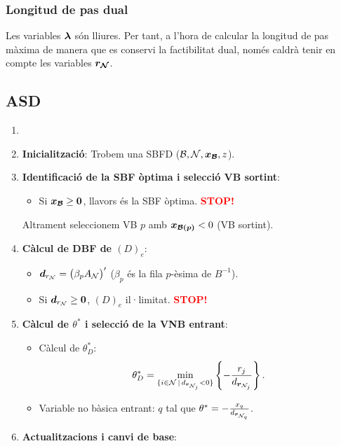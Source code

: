 \subsubsection{Longitud de pas dual}
Les variables $\boldsymbol{\lambda}$ són lliures. Per tant, a l'hora de calcular la longitud de pas màxima de manera que es conservi la factibilitat dual, només caldrà tenir en compte les variables $\boldsymbol{r_{\mathcal{N}}}$.

\subsection{ASD}
\begin{alg}
    \begin{enumerate}
        \item[]
        \item {\bf Inicialització}: Trobem una SBFD ($\mathcal{B}, \mathcal{N}, \boldsymbol{x_{\mathcal{B}}}, z$).
        \item \label{simp_dual_pas2} {\bf Identificació de la SBF òptima i selecció VB sortint}:
            \begin{itemize}
                \item Si $\boldsymbol{x_{\mathcal{B}}} \geq \boldsymbol{0}$, llavors és la SBF òptima. \textcolor{red}{\bf STOP!}
            \end{itemize}
            Altrament seleccionem VB $p$ amb $\boldsymbol{x_{\mathcal{B}\left(p\right)}} < 0$ (VB sortint).
        \item {\bf Càlcul de DBF de $\left(D\right)_e$}:
            \begin{itemize}
                \item $\boldsymbol{d}_{r_{\mathcal{N}}} = \left(\beta_p A_{\mathcal{N}}\right)^\prime$ ($\beta_p$ és la fila $p$-èsima de $B^{-1}$).
                \item Si $\boldsymbol{d}_{r_{\mathcal{N}}} \geq \boldsymbol{0}$, $\left(D\right)_e$ il·limitat. \textcolor{red}{\bf STOP!}
            \end{itemize}
        \item {\bf Càlcul de $\theta^*$ i selecció de la VNB entrant}:
            \begin{itemize}
                \item Càlcul de $\theta_D^*$: 
                    \[\theta_D^* = \min_{\{i \in \mathcal{N} \,|\, d_{\boldsymbol{r}_{\mathcal{N}_j}} < 0\}} \left\{-\frac{r_j}{d_{\boldsymbol{r}_{\mathcal{N}_j}}} \right\}.\]
                \item Variable no bàsica entrant: $q$ tal que $\theta^* = -\frac{x_q}{d_{\boldsymbol{r}_{\mathcal{N}_q}}}$.
            \end{itemize}
        \item {\bf Actualitzacions i canvi de base}:

\end{enumerate}
\end{alg}
